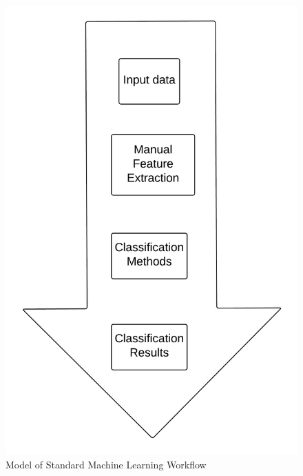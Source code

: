 \documentclass{sig-alternate}
\begin{document}

\begin{figure}[H]
	\begin{center}
		\includegraphics[width=0.75\linewidth]{mlworkflow}
	\end{center}
	\vspace{-12pt}
	\caption{Model of Standard Machine Learning Workflow}
	\label{fig:mlworkflow}
\end{figure}
\end{document}
